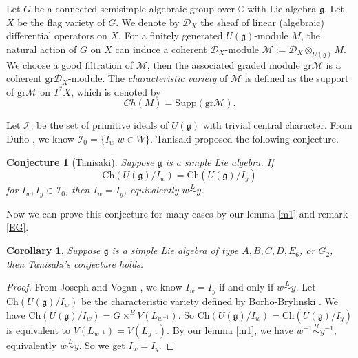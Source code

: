 \documentclass{amsart}[12pt]
\newtheorem{Cor}{Corollary}[section]
\newtheorem{Con}{Conjecture}[section]
\numberwithin{equation}{section}
\begin{document}






Let $G$ be a connected semisimple algebraic group over $\mathbb{C}$ with Lie algebra $\mathfrak{g}$. Let $X$ be the flag variety of $G$. We denote by $\mathcal{D}_X$ the sheaf of linear (algebraic) differential operators on $X$. For a finitely generated $U(\mathfrak{g})$-module $M$, the natural action of $G$ on $X$ can induce a coherent $\mathcal{D}_X$-module
 $\mathcal{M}:=\mathcal{D}_X\otimes_{U(\mathfrak{g})}M$. We choose a good filtration of $\mathcal{M}$, then the associated graded module $\text{gr}\mathcal{M}$ is a coherent $\text{gr}\mathcal{D}_X$-module.
 The \textit{characteristic variety} of $\mathcal{M}$ is
 defined as  the support of $\text{gr}\mathcal{M}$  on $T^*X$, which is denoted by $$Ch(M)=\text{Supp}(\text{gr}\mathcal{M}).$$




 Let $\mathscr{I}_0$ be the set of primitive ideals of $U(\mathfrak{g})$ with trivial central character. From Duflo \cite{Du}, we know $\mathscr{I}_0=\{I_w| w\in W\}$.  Tanisaki \cite{Ta} proposed the following conjecture.


 \begin{Con}[Tanisaki]Suppose $\mathfrak{g}$ is a simple Lie algebra.
If $$\text{Ch}(U(\mathfrak{g})/I_w)=\text{Ch}(U(\mathfrak{g})/I_y)$$ for $I_w,I_y \in \mathscr{I}_0$, then $I_w=I_y$, equivalently $w\stackrel{L}{\sim} y$.
\end{Con}


Now we can prove this conjecture for many cases by our lemma \ref{m1} and remark \ref{EG}.

 \begin{Cor}Suppose $\mathfrak{g}$ is a simple Lie algebra
	of type $A, B, C, D, E_6$, or $G_2$,
then Tanisaki's conjecture holds.
\end{Cor}

\begin{proof}

 From Joseph \cite{Jo79} and Vogan \cite{Vo80}, we know $I_w=I_y$ if and only if $w\stackrel{L}{\sim} y$.
Let $\text{Ch}(U(\mathfrak{g})/I_w)$ be the characteristic variety defined by Borho-Brylinski \cite{BoB3}. We have $\text{Ch}(U(\mathfrak{g})/I_w)=G\times^{B}V(L_{w^{-1}})$.   So $\text{Ch}(U(\mathfrak{g})/I_w)=\text{Ch}(U(\mathfrak{g})/I_y)$ is equivalent to $V(L_{w^{-1}})=V(L_{y^{-1}})$.  By our lemma \ref{m1}, we have $w^{-1}\stackrel{R}{\sim} y^{-1}$, equivalently $w\stackrel{L}{\sim} y$. So we get  $I_w=I_y$.

\end{proof}
\end{document}
